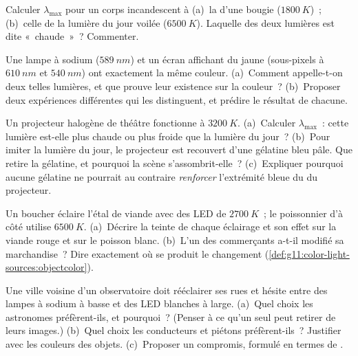 \begin{exercise}[$\star\star$]\label{exo:g11:color-light-sources:11}
Calculer $\lambda_{\max}$ pour un corps incandescent à (a)~la
 d'une bougie
($\qty{1800}{K}$)~; (b)~celle de la lumière du jour voilée
($\qty{6500}{K}$). Laquelle des deux lumières est dite «~chaude~»~?
Commenter.
\end{exercise}

\begin{exercise}[$\star\star\star$]\label{exo:g11:color-light-sources:12}
Une lampe à sodium ($\qty{589}{nm}$) et un écran affichant du jaune
(sous-pixels à $\qty{610}{nm}$ et $\qty{540}{nm}$) ont exactement la
même couleur. (a)~Comment appelle-t-on deux telles lumières, et que
prouve leur existence sur la couleur~? (b)~Proposer deux expériences
différentes qui les distinguent, et prédire le résultat de chacune.
\end{exercise}

\begin{exercise}[$\star\star\star$]\label{exo:g11:color-light-sources:13}
Un projecteur halogène de théâtre fonctionne à $\qty{3200}{K}$.
(a)~Calculer $\lambda_{\max}$~: cette lumière est-elle plus chaude ou
plus froide que la lumière du jour~? (b)~Pour imiter la lumière du
jour, le projecteur est recouvert d'une gélatine bleu pâle. Que retire
la gélatine, et pourquoi la scène s'assombrit-elle~? (c)~Expliquer
pourquoi aucune gélatine ne pourrait au contraire
\emph{renforcer} l'extrémité bleue du  du
projecteur.
\end{exercise}

\begin{exercise}[$\star\star\star$]\label{exo:g11:color-light-sources:14}
Un boucher éclaire l'étal de viande avec des LED de
 $\qty{2700}{K}$~; le
poissonnier d'à côté utilise $\qty{6500}{K}$.
(a)~Décrire la teinte de chaque éclairage et son effet sur la viande
rouge et sur le poisson blanc. (b)~L'un des commerçants a-t-il modifié
sa marchandise~? Dire exactement où se produit le changement
(\cref{def:g11:color-light-sources:objectcolor}).
\end{exercise}

\begin{exercise}[$\star\star\star$]\label{exo:g11:color-light-sources:15}
Une ville voisine d'un observatoire doit rééclairer ses rues et
hésite entre des lampes à sodium à
basse  et des LED blanches à
 large.
(a)~Quel choix les astronomes préfèrent-ils, et pourquoi~? (Penser à
ce qu'un seul  peut retirer de leurs
images.) (b)~Quel choix les conducteurs et piétons préfèrent-ils~?
Justifier avec les couleurs des objets.
(c)~Proposer un compromis, formulé en termes de
.
\end{exercise}

